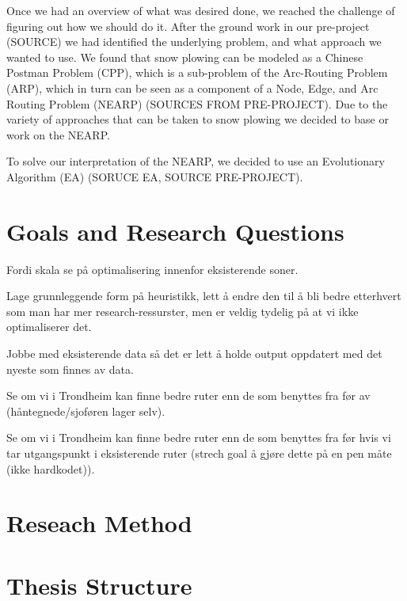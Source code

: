 Once we had an overview of what was desired done, we reached the challenge of figuring out how we should do it. After the ground work in our pre-project (SOURCE) we had identified the underlying problem, and what approach we wanted to use. We found that snow plowing can be modeled as a Chinese Postman Problem (CPP), which is a sub-problem of the Arc-Routing Problem (ARP), which in turn can be seen as a component of a Node, Edge, and Arc Routing Problem (NEARP) (SOURCES FROM PRE-PROJECT). Due to the variety of approaches that can be taken to snow plowing we decided to base or work on the NEARP.

To solve our interpretation of the NEARP, we decided to use an Evolutionary Algorithm (EA) (SORUCE EA, SOURCE PRE-PROJECT).

\section{Goals and Research Questions}

Fordi skala se på optimalisering innenfor eksisterende soner.

Lage grunnleggende form på heuristikk, lett å endre den til å bli bedre etterhvert som man har mer research-ressurster, men er veldig tydelig på at vi ikke optimaliserer det.

Jobbe med eksisterende data så det er lett å holde output oppdatert med det nyeste som finnes av data.

Se om vi i Trondheim kan finne bedre ruter enn de som benyttes fra før av (håntegnede/sjoføren lager selv).

Se om vi i Trondheim kan finne bedre ruter enn de som benyttes fra før hvis vi tar utgangspunkt i eksisterende ruter (strech goal å gjøre dette på en pen måte (ikke hardkodet)).

\section{Reseach Method}

\section{Thesis Structure}



\cleardoublepage
